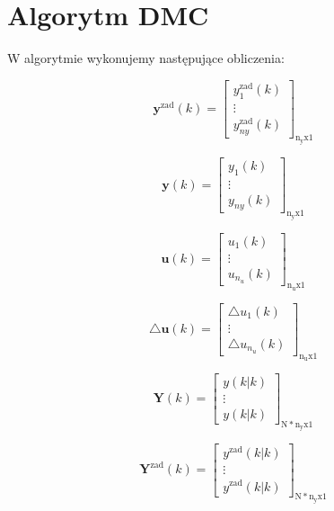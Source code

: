 \section{Algorytm DMC}
W algorytmie wykonujemy następujące obliczenia:

\begin{equation}
\boldsymbol{y}^{\mathrm{zad}}(k)=\left[
\begin{array}{c}
y^{\mathrm{zad}}_1(k)\\
\vdots\\
y^{\mathrm{zad}}_{ny}(k)
\end{array}
\right]_{\mathrm{n_yx1}}
\label{yzadm}
\end{equation}

\begin{equation}
\boldsymbol{y}(k)=\left[
\begin{array}{c}
y_1(k)\\
\vdots\\
y_{ny}(k)
\end{array}
\right]_{\mathrm{n_yx1}}
\label{ym}
\end{equation}

\begin{equation}
\boldsymbol{u}(k)=\left[
\begin{array}{c}
u_1(k)\\
\vdots\\
u_{n_u}(k)
\end{array}
\right]_{\mathrm{n_ux1}}
\label{Um}
\end{equation}

\begin{equation}
\triangle\boldsymbol{u}(k)=\left[
\begin{array}{c}
\triangle u_1(k)\\
\vdots\\
\triangle u_{n_u}(k)
\end{array}
\right]_{\mathrm{n_ux1}}
\label{dUm}
\end{equation}

\begin{equation}
\boldsymbol{Y}(k)=\left[
\begin{array}{c}
y(k|k)\\
\vdots\\
y(k|k)
\end{array}
\right]_{\mathrm{N*n_yx1}}
\label{Y}
\end{equation}

\begin{equation}
\boldsymbol{Y}^{\mathrm{zad}}(k)=\left[
\begin{array}{c}
y^{\mathrm{zad}}(k|k)\\
\vdots\\
y^{\mathrm{zad}}(k|k)
\end{array}
\right]_{\mathrm{N*n_yx1}}
\label{Yzad}
\end{equation}

